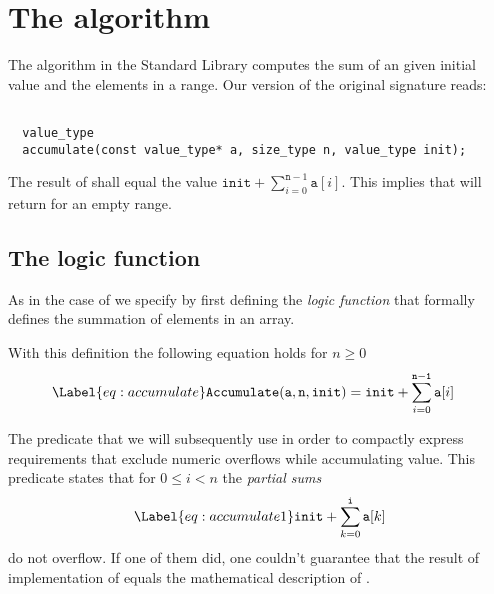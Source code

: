 
\section{The \accumulate algorithm}

The \accumulate algorithm in the \cxx Standard Library \cite[\S 29.8.2]{cxx-17-draft} computes
the sum of an given initial value and the elements in a range.
%
Our version of the original signature
reads:

\begin{lstlisting}[style=acsl-block]

  value_type
  accumulate(const value_type* a, size_type n, value_type init);
\end{lstlisting} 

The result of \accumulate shall equal the value
$\displaystyle{ \mathtt{init} + \sum_{i = 0}^{\mathtt{n}-1} \mathtt{a}[i] }$.
This implies that \accumulate will return  for an empty range.


\subsection{The logic function \Accumulate}

As in the case of   we specify \accumulate by first defining the
\emph{logic function}  that formally defines
the summation of elements in an array.



With this definition the following equation holds for $n \geq 0$
\begin{align}
\Label{eq:accumulate}
    \mathtt{Accumulate}(\mathtt{a}, \mathtt{n}, \mathtt{init})
    &= \mathtt{init} + \sum_{i = 0}^{\mathtt{n-1}} \mathtt{a}[i]
\end{align}

The predicate  that we will subsequently use
in order to compactly express requirements that exclude numeric
overflows while accumulating value.
This predicate states that  for $0 \leq i < n$ the \emph{partial sums} 
%
\begin{gather}
\Label{eq:accumulate1}
\mathtt{init} + \sum_{k = 0}^{\mathtt{i}} \mathtt{a}[k]
\end{gather}
%
do not overflow.
If one of them did, one couldn't guarantee that the result of \isoc implementation
of \accumulate equals the mathematical description of \Accumulate.

